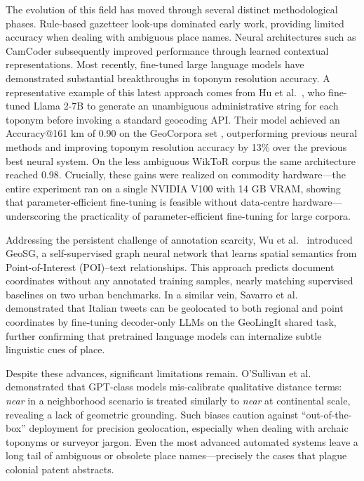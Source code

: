 The evolution of this field has moved through several distinct
methodological phases. Rule-based gazetteer look-ups dominated early
work, providing limited accuracy when dealing with ambiguous place
names. Neural architectures such as CamCoder \citep{Gritta2018_camcoder}
subsequently improved performance through learned contextual
representations. Most recently, fine-tuned large language models have
demonstrated substantial breakthroughs in toponym resolution accuracy. A
representative example of this latest approach comes from Hu et
al.~\citep{Hu2024_toponym_llm}, who fine-tuned Llama 2-7B to generate an
unambiguous administrative string for each toponym before invoking a
standard geocoding API. Their model achieved an Accuracy@161 km of 0.90
on the GeoCorpora set \citep{wallgrun2017geocorpora}, outperforming
previous neural methods and improving toponym resolution accuracy by
13\% over the previous best neural system. On the less ambiguous WikToR
corpus \citep{gritta2018whatsmissing} the same architecture reached
0.98. Crucially, these gains were realized on commodity hardware---the
entire experiment ran on a single NVIDIA V100 with 14 GB VRAM, showing
that parameter‑efficient fine‑tuning is feasible without data‑centre
hardware---underscoring the practicality of parameter-efficient
fine-tuning for large corpora.

Addressing the persistent challenge of annotation scarcity, Wu et
al.~\citep{wu2025geosg} introduced GeoSG, a self-supervised graph neural
network that learns spatial semantics from Point-of-Interest (POI)--text
relationships. This approach predicts document coordinates without any
annotated training samples, nearly matching supervised baselines on two
urban benchmarks. In a similar vein, Savarro et
al.~\citep{savarro2024geolingit} demonstrated that Italian tweets can be
geolocated to both regional and point coordinates by fine-tuning
decoder-only LLMs on the GeoLingIt shared task, further confirming that
pretrained language models can internalize subtle linguistic cues of
place.

Despite these advances, significant limitations remain. O'Sullivan et
al.~\citep{Osullivan2024_metric} demonstrated that GPT-class models
mis-calibrate qualitative distance terms: \emph{near} in a neighborhood
scenario is treated similarly to \emph{near} at continental scale,
revealing a lack of geometric grounding. Such biases caution against
``out-of-the-box'' deployment for precision geolocation, especially when
dealing with archaic toponyms or surveyor jargon. Even the most advanced
automated systems leave a long tail of ambiguous or obsolete place
names---precisely the cases that plague colonial patent abstracts.

